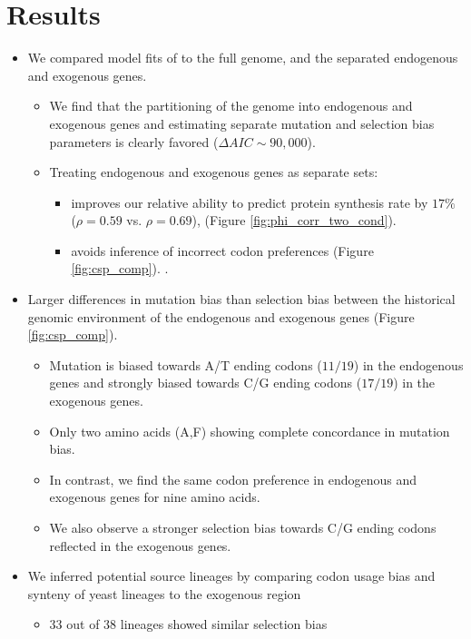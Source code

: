 \documentclass[12pt]{article}
\begin{document}
\section*{Results}
	
\begin{itemize}
	\item We compared model fits of \ROC to the full \kluyveri genome, and the separated endogenous and exogenous genes.
	\begin{itemize}
		\item We find that the partitioning of the \kluyveri genome into endogenous and exogenous genes and estimating separate mutation and selection bias parameters is clearly favored ($\Delta AIC \sim 90,000$).
		\item Treating endogenous and exogenous genes as separate sets:
		\begin{itemize}
			\item improves our relative ability to predict protein synthesis rate by $17 \%$ ($\rho = 0.59$ vs. $\rho = 0.69$), (Figure \ref{fig:phi_corr_two_cond}).
			\item avoids inference of incorrect codon preferences  (Figure \ref{fig:csp_comp}). .
		\end{itemize}
	\end{itemize}
	\item Larger differences in mutation bias than selection bias between the historical genomic environment of the endogenous and exogenous genes (Figure \ref{fig:csp_comp}).
	\begin{itemize}
		\item Mutation is biased towards A/T ending codons ($11/19$) in the endogenous genes and strongly biased towards C/G ending codons ($17/19$) in the exogenous genes.
		\item Only two amino acids (A,F) showing complete concordance in mutation bias.
		\item In contrast, we find the same codon preference in endogenous and exogenous genes for nine amino acids. 
		\item We also observe a stronger selection bias towards C/G ending codons reflected in the exogenous genes. 
	\end{itemize}
	\item We inferred potential source lineages by comparing codon usage bias and synteny of yeast lineages to the exogenous region
	\begin{itemize}
		\item 33 out of 38 lineages showed similar selection bias

\end{itemize}
\end{itemize}
\end{document}
